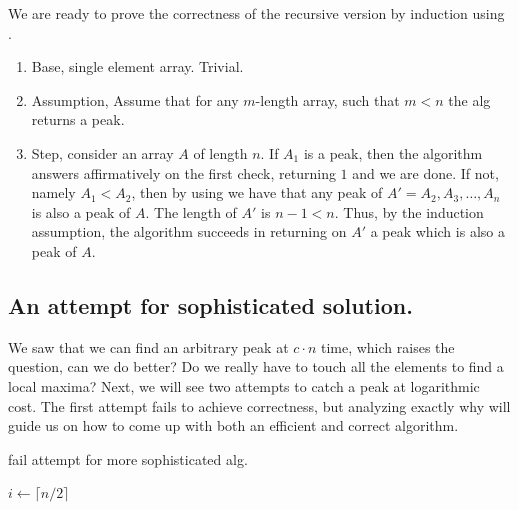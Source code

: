 %
%
%

We are ready to prove the correctness of the recursive version by induction using . 

\begin{enumerate}
  \item Base, single element array. Trivial. 
  \item Assumption, Assume that for any $m$-length array, such that $m<n$ the alg returns a peak. 
  \item Step, consider an array $A$ of length $n$. If $A_1$ is a peak, then the algorithm answers affirmatively on the first check, returning $1$ and we are done. If not, namely $A_1 < A_2$, then by using  we have that any peak of $A' = A_2, A_3, \dots, A_n$ is also a peak of $A$. The length of $A'$ is $n-1 < n$. Thus, by the induction assumption, the algorithm succeeds in returning on $A'$ a peak which is also a peak of $A$.
\end{enumerate}

\subsection{An attempt for sophisticated solution.}
We saw that we can find an arbitrary peak at $c\cdot n$ time, which raises the question, can we do better? Do we really have to touch all the elements to find a local maxima? Next, we will see two attempts to catch a peak at logarithmic cost. The first attempt fails to achieve correctness, but analyzing exactly why will guide us on how to come up with both an efficient and correct algorithm.
\begin{algorithm}
\caption{fail attempt for more sophisticated alg. }
        $ i \leftarrow  \lceil n/2 \rceil $\\
\end{algorithm}

